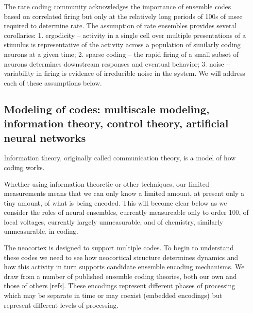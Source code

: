 \documentclass[12pt]{article}
\begin{document}
The rate coding community
acknowledges the importance of ensemble codes based on correlated firing but only at the relatively long periods of 100s of msec required to determine
rate.\cite{Georgopoulos1986-dv} The assumption of rate ensembles provides several corollaries: 1. ergodicity -- activity in a single cell over multiple presentations of a stimulus is
representative of the activity across a population of similarly coding neurons at a given time; 2. sparse coding -- the rapid firing of a small subset of neurons determines
downstream responses and eventual behavior; 3. noise -- variability in firing is evidence of irreducible noise in the system. We will address each of these assumptions below.

\subsection{Modeling of codes: multiscale modeling, information theory, control theory, artificial neural networks}

Information theory, originally called communication theory, is a model of how coding works.

Whether using information theoretic or other techniques, our limited measurements means that we can only know a limited amount, at present only a tiny amount, of what is being
encoded. This will become clear below as we consider the roles of neural ensembles, currently measureable only to order 100, of local voltages, currently largely unmeasurable,
and of chemistry, similarly unmeasurable, in coding.


The neocortex is designed to support multiple codes. To begin to understand these codes we need to see how neocortical structure determines dynamics and how this activity in
turn supports candidate ensemble encoding mechanisms. We draw from a number of published ensemble coding theories, both our own and those of others [refs]. These encodings
represent different phases of processing which may be separate in time or may coexist (embedded encodings) but represent different levels of processing.

\end{document}
